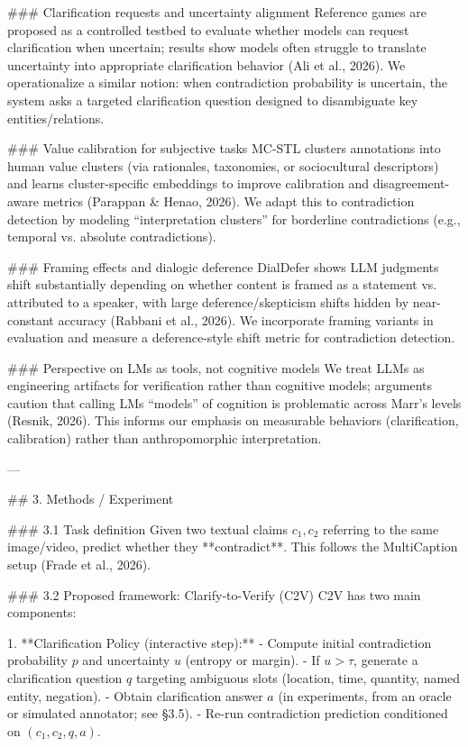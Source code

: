 ### Clarification requests and uncertainty alignment  
Reference games are proposed as a controlled testbed to evaluate whether models can request clarification when uncertain; results show models often struggle to translate uncertainty into appropriate clarification behavior (Ali et al., 2026). We operationalize a similar notion: when contradiction probability is uncertain, the system asks a targeted clarification question designed to disambiguate key entities/relations.

### Value calibration for subjective tasks  
MC-STL clusters annotations into human value clusters (via rationales, taxonomies, or sociocultural descriptors) and learns cluster-specific embeddings to improve calibration and disagreement-aware metrics (Parappan & Henao, 2026). We adapt this to contradiction detection by modeling “interpretation clusters” for borderline contradictions (e.g., temporal vs. absolute contradictions).

### Framing effects and dialogic deference  
DialDefer shows LLM judgments shift substantially depending on whether content is framed as a statement vs. attributed to a speaker, with large deference/skepticism shifts hidden by near-constant accuracy (Rabbani et al., 2026). We incorporate framing variants in evaluation and measure a deference-style shift metric for contradiction detection.

### Perspective on LMs as tools, not cognitive models  
We treat LLMs as engineering artifacts for verification rather than cognitive models; arguments caution that calling LMs “models” of cognition is problematic across Marr’s levels (Resnik, 2026). This informs our emphasis on measurable behaviors (clarification, calibration) rather than anthropomorphic interpretation.

---

## 3. Methods / Experiment  

### 3.1 Task definition  
Given two textual claims \(c_1, c_2\) referring to the same image/video, predict whether they **contradict**. This follows the MultiCaption setup (Frade et al., 2026).

### 3.2 Proposed framework: Clarify-to-Verify (C2V)  
C2V has two main components:

1. **Clarification Policy (interactive step):**  
   - Compute initial contradiction probability \(p\) and uncertainty \(u\) (entropy or margin).  
   - If \(u > \tau\), generate a clarification question \(q\) targeting ambiguous slots (location, time, quantity, named entity, negation).  
   - Obtain clarification answer \(a\) (in experiments, from an oracle or simulated annotator; see §3.5).  
   - Re-run contradiction prediction conditioned on \((c_1, c_2, q, a)\).

